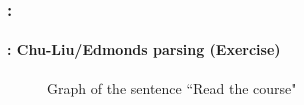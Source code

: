 \documentclass[xcolor=table]{beamer}
\begin{document}
\begin{frame}
	\frametitle{\insertshortsubtitle: \insertsection}
	\framesubtitle{\insertsubsection: Chu-Liu/Edmonds parsing (Exercise)}

	\begin{figure}
		\centering
		\caption{Graph of the sentence ``Read the course" }
	\end{figure}

\end{frame}


\end{document}
